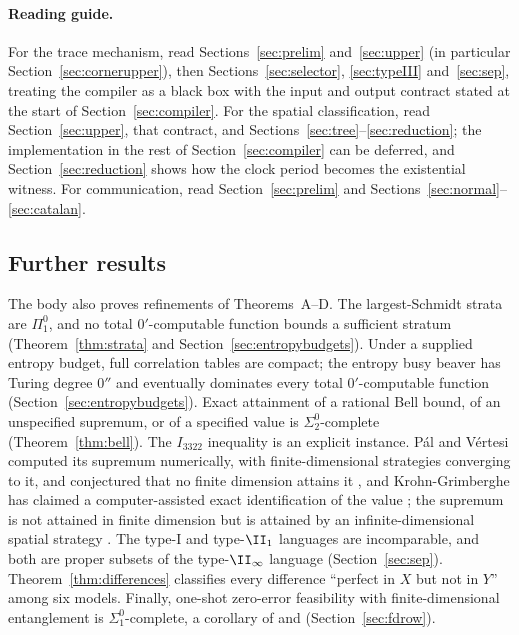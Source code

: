 \paragraph{Reading guide.} For the trace mechanism, read Sections~\ref{sec:prelim} and~\ref{sec:upper} (in particular Section~\ref{sec:cornerupper}), then Sections~\ref{sec:selector}, \ref{sec:typeIII} and~\ref{sec:sep}, treating the compiler as a black box with the input and output contract stated at the start of Section~\ref{sec:compiler}. For the spatial classification, read Section~\ref{sec:upper}, that contract, and Sections~\ref{sec:tree}--\ref{sec:reduction}; the implementation in the rest of Section~\ref{sec:compiler} can be deferred, and Section~\ref{sec:reduction} shows how the clock period becomes the existential witness. For communication, read Section~\ref{sec:prelim} and Sections~\ref{sec:normal}--\ref{sec:catalan}.

\subsection{Further results}
The body also proves refinements of Theorems~A--D. The largest-Schmidt strata are $\Pi^0_1$, and no total $0'$-computable function bounds a sufficient stratum (Theorem~\ref{thm:strata} and Section~\ref{sec:entropybudgets}). Under a supplied entropy budget, full correlation tables are compact; the entropy busy beaver has Turing degree $0''$ and eventually dominates every total $0'$-computable function (Section~\ref{sec:entropybudgets}). Exact attainment of a rational Bell bound, of an unspecified supremum, or of a specified value is $\Sigma^0_2$-complete (Theorem~\ref{thm:bell}). The $I_{3322}$ inequality is an explicit instance. P\'al and V\'ertesi computed its supremum numerically, with finite-dimensional strategies converging to it, and conjectured that no finite dimension attains it \cite{PalVertesi}, and Krohn-Grimberghe has claimed a computer-assisted exact identification of the value \cite{KrohnGrimberghe}; the supremum is not attained in finite dimension \cite{Pauwels,Coladangelo3322,Douglas3322} but is attained by an infinite-dimensional spatial strategy \cite{Coladangelo3322,Douglas3322}. The type-I and type-$\II_1$ languages are incomparable, and both are proper subsets of the type-$\II_\infty$ language (Section~\ref{sec:sep}). Theorem~\ref{thm:differences} classifies every difference ``perfect in $X$ but not in $Y$'' among six models. Finally, one-shot zero-error feasibility with finite-dimensional entanglement is $\Sigma^0_1$-complete, a corollary of \cite{Mancinska} and \cite{MIPRE} (Section~\ref{sec:fdrow}).

